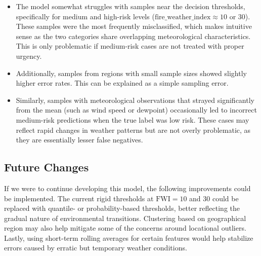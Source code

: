 \documentclass[11pt]{article}
\begin{document}
\begin{itemize}
    \item The model somewhat struggles with samples near the decision thresholds, specifically for medium and high-risk levels ($\text{fire\_weather\_index} \approx 10$ or $30$). These samples were the most frequently misclassified, which makes intuitive sense as the two categories share overlapping meteorological characteristics. This is only problematic if medium-risk cases are not treated with proper urgency.
    \item Additionally, samples from regions with small sample sizes showed slightly higher error rates. This can be explained as a simple sampling error.
    \item Similarly, samples with meteorological observations that strayed significantly from the mean (such as wind speed or dewpoint) occasionally led to incorrect medium-risk predictions when the true label was low risk. These cases may reflect rapid changes in weather patterns but are not overly problematic, as they are essentially lesser false negatives.
\end{itemize}

\subsection{Future Changes}

If we were to continue developing this model, the following improvements could be implemented. The current rigid thresholds at $\text{FWI} = 10$ and $30$ could be replaced with quantile- or probability-based thresholds, better reflecting the gradual nature of environmental transitions. Clustering based on geographical region may also help mitigate some of the concerns around locational outliers. Lastly, using short-term rolling averages for certain features would help stabilize errors caused by erratic but temporary weather conditions.
\end{document}

